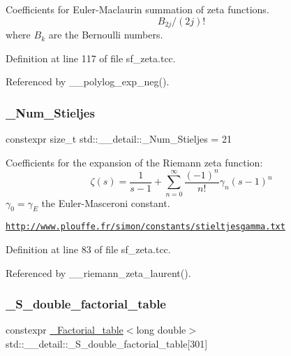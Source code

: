 Coefficients for Euler-\/\+Maclaurin summation of zeta functions. \[ B_{2j} / (2j)! \] where $ B_k $ are the Bernoulli numbers. 

Definition at line 117 of file sf\+\_\+zeta.\+tcc.



Referenced by \+\_\+\+\_\+polylog\+\_\+exp\+\_\+neg().

\mbox{\label{namespacestd_1_1____detail_ab80ca58ee274bce962adc6208bfe4e2d}} 
\subsubsection{\texorpdfstring{\+\_\+\+Num\+\_\+\+Stieljes}{\_Num\_Stieljes}}
{\footnotesize\ttfamily constexpr size\+\_\+t std\+::\+\_\+\+\_\+detail\+::\+\_\+\+Num\+\_\+\+Stieljes = 21}

Coefficients for the expansion of the Riemann zeta function\+: \[ \zeta(s) = \frac{1}{s-1} + \sum_{n=0}^{\infty}\frac{(-1)^n}{n!}\gamma_n(s-1)^n \] $ \gamma_0 = \gamma_E $ the Euler-\/\+Masceroni constant.

\href{http://www.plouffe.fr/simon/constants/stieltjesgamma.txt}{\tt http\+://www.\+plouffe.\+fr/simon/constants/stieltjesgamma.\+txt} 

Definition at line 83 of file sf\+\_\+zeta.\+tcc.



Referenced by \+\_\+\+\_\+riemann\+\_\+zeta\+\_\+laurent().

\mbox{\label{namespacestd_1_1____detail_a6d1131fefdb30b2746c76ff801bdc833}} 
\subsubsection{\texorpdfstring{\+\_\+\+S\+\_\+double\+\_\+factorial\+\_\+table}{\_S\_double\_factorial\_table}}
{\footnotesize\ttfamily constexpr \hyperlink{structstd_1_1____detail_1_1__Factorial__table}{\+\_\+\+Factorial\+\_\+table}$<$long double$>$ std\+::\+\_\+\+\_\+detail\+::\+\_\+\+S\+\_\+double\+\_\+factorial\+\_\+table\mbox{[}301\mbox{]}}



